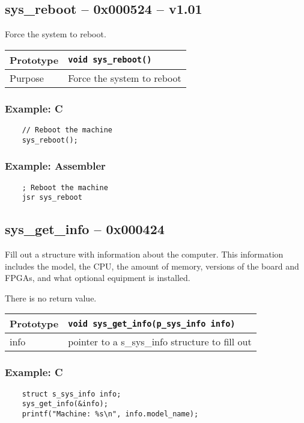 \subsection*{sys\_reboot -- 0x000524 -- v1.01}
Force the system to reboot.

\bigskip

\begin{table}[!h]\begin{tabular}{|l||l|} \hline
Prototype & \lstinline!void sys_reboot()! \\ \hline
Purpose & Force the system to reboot \\ \hline
\end{tabular}\end{table}

\subsubsection*{Example: C}
\begin{lstlisting}
    // Reboot the machine
    sys_reboot();	
\end{lstlisting}

\subsubsection*{Example: Assembler}
\begin{verbatim}
    ; Reboot the machine
    jsr sys_reboot
\end{verbatim}

\subsection*{sys\_get\_info -- 0x000424}
Fill out a structure with information about the computer. This information includes the model, the CPU, the amount of memory,
versions of the board and FPGAs, and what optional equipment is installed.

There is no return value.

\bigskip

\begin{tabular}{|l||l|} \hline
Prototype & \lstinline!void sys_get_info(p_sys_info info)! \\ \hline
info & pointer to a s\_sys\_info structure to fill out \\ \hline
\end{tabular}

\subsubsection*{Example: C}
\begin{lstlisting}
    struct s_sys_info info;
    sys_get_info(&info);
    printf("Machine: %s\n", info.model_name);	
\end{lstlisting}

